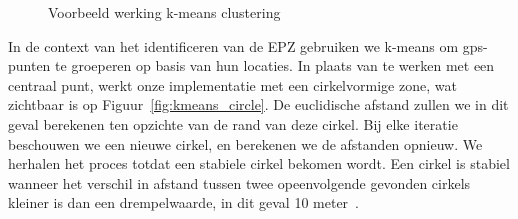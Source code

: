 \begin{figure}[h]
\begin{subfigure}[b]{.33\textwidth}
    \end{subfigure}
    \caption{Voorbeeld werking k-means clustering~\cite{InDepthk59:online}}\label{fig:kmeans}
\end{figure}

In de context van het identificeren van de \ac{EPZ} gebruiken we k-means om
\ac{gps}-punten te groeperen op basis van hun locaties. In plaats van te werken
met een centraal punt, werkt onze implementatie met een cirkelvormige zone, wat
zichtbaar is op Figuur~\ref{fig:kmeans_circle}. De euclidische afstand zullen
we in dit geval berekenen ten opzichte van de rand van deze cirkel. Bij elke
iteratie beschouwen we een nieuwe cirkel, en berekenen we de afstanden opnieuw.
We herhalen het proces totdat een stabiele cirkel bekomen wordt. Een cirkel is
stabiel wanneer het verschil in afstand tussen twee opeenvolgende gevonden
cirkels kleiner is dan een drempelwaarde, in dit geval 10 meter~\cite{Dhondt,
    Verdonck_2022}.
